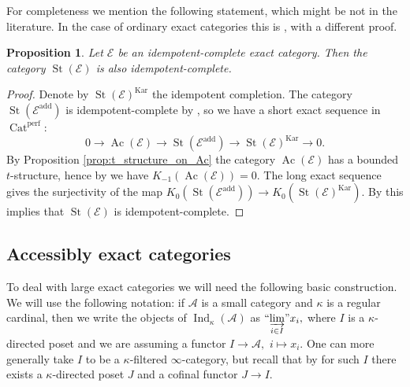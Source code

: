 \documentclass[11pt,leqno]{amsart}
\newtheorem{prop}[theo]{Proposition}
\numberwithin{equation}{section}
\newcommand{\indlim}[1][]{\mathop{\varinjlim}\limits_{#1}}
\newcommand{\inddlim}[1][]{{``{\indlim[#1]}"}}
\newcommand{\Cat}{\operatorname{Cat}}
\newcommand{\St}{\operatorname{St}}
\newcommand{\cA}{{\mathcal A}}
\newcommand{\cE}{{\mathcal E}}
\newcommand{\perf}{\operatorname{perf}}
\newcommand{\Kar}{\operatorname{Kar}}
\newcommand{\add}{\operatorname{add}}
\newcommand{\Ind}{\operatorname{Ind}}
\newcommand{\Ac}{\operatorname{Ac}}
\begin{document}
For completeness we mention the following statement, which might be not in the literature. In the case of ordinary exact categories this is \cite[Theorem 2.8]{BS01}, with a different proof.

\begin{prop}
Let $\cE$ be an idempotent-complete exact category. Then the category $\St(\cE)$ is also idempotent-complete.
\end{prop}

\begin{proof}
Denote by $\St(\cE)^{\Kar}$ the idempotent completion. The category $\St(\cE^{\add})$ is idempotent-complete by \cite[Theorem 5.3.1, Proposition 6.2.1]{Bon}, so we have a short exact sequence in $\Cat^{\perf}:$
\begin{equation*}
0\to\Ac(\cE)\to \St(\cE^{\add})\to\St(\cE)^{\Kar}\to 0.
\end{equation*}
By Proposition \ref{prop:t_structure_on_Ac} the category $\Ac(\cE)$ has a bounded $t$-structure, hence by \cite[Theorem 2.35]{AGH19} we have $K_{-1}(\Ac(\cE))=0.$ The long exact sequence gives the surjectivity of the map $K_0(\St(\cE^{\add}))\to K_0(\St(\cE)^{\Kar}).$ By \cite[Theorem 2.1]{Th} this implies that $\St(\cE)$ is idempotent-complete.
\end{proof}

\subsection{Accessibly exact categories}

To deal with large exact categories we will need the following basic construction. We will use the following notation: if $\cA$ is a small category and $\kappa$ is a regular cardinal, then we write the objects of $\Ind_{\kappa}(\cA)$ as $\inddlim[i\in I]x_i,$ where $I$ is a $\kappa$-directed poset and we are assuming a functor $I\to\cA,$ $i\mapsto x_i.$ One can more generally take $I$ to be a $\kappa$-filtered $\infty$-category, but recall that by \cite[Proposition 5.3.1.18]{Lur09} for such $I$ there exists a $\kappa$-directed poset $J$ and a cofinal functor $J\to I.$ 
\end{document}
